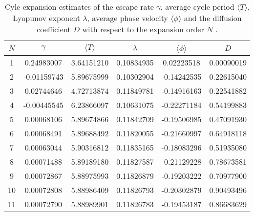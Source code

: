 \begin{table}
	\begin{tabular}{c|c|c|c|c|c}
	 $N$ & $\gamma$ & $\langle T \rangle$ & $\lambda$ & $\langle \dot{\phi} \rangle$ & $D$ \\ 
	\hline
	1 & 0.24983007 & 3.64151210 & 0.10834935 & 0.02223518 & 0.00090019 \\ 
 	2 & -0.01159743 & 5.89675999 & 0.10302904 & -0.14242535 & 0.22615040 \\ 
 	3 & 0.02744646 & 4.72713874 & 0.11849781 & -0.14916163 & 0.22541882 \\ 
 	4 & -0.00445545 & 6.23866097 & 0.10631075 & -0.22271184 & 0.54199883 \\ 
 	5 & 0.00068106 & 5.89674866 & 0.11842709 & -0.19506985 & 0.47091930 \\ 
 	6 & 0.00068491 & 5.89688492 & 0.11820055 & -0.21660997 & 0.64918118 \\ 
 	7 & 0.00063044 & 5.90316812 & 0.11835165 & -0.18083296 & 0.51935080 \\ 
 	8 & 0.00071488 & 5.89189180 & 0.11827587 & -0.21129228 & 0.78673581 \\ 
 	9 & 0.00072867 & 5.88975993 & 0.11826879 & -0.19203222 & 0.70977900 \\ 
 	10 & 0.00072808 & 5.88986409 & 0.11826793 & -0.20302879 & 0.90493496 \\ 
 	11 & 0.00072790 & 5.88989901 & 0.11826783 & -0.19453187 & 0.86683629 \\ 
 	\end{tabular}
	\caption{Cyle expansion estimates of the escape rate $\gamma$, average cycle period $\langle T \rangle$, Lyapunov exponent $\lambda$, average phase velocity $\langle \dot{\phi} \rangle$ and the diffusion coefficient $D$ with respect to the expansion order $N$ .}
	\label{t-DynamicalAverages}
\end{table}